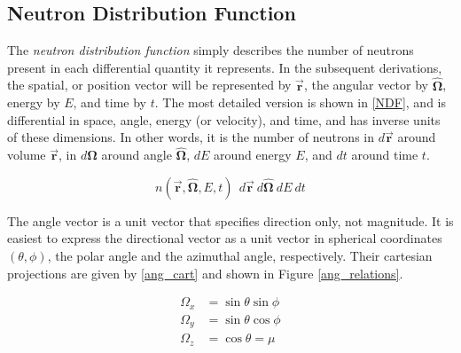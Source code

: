 \subsection{Neutron Distribution Function}

The \emph{neutron distribution function} simply describes the number of neutrons present in each differential quantity it represents.  In the subsequent derivations, the spatial, or position vector will be represented by $\boldsymbol{\vec{r}}$, the angular vector by $\boldsymbol{\hat{\Omega}}$, energy by $E$, and time by $t$.   The most detailed version is shown in \eqref{NDF}, and is differential in space, angle, energy (or velocity), and time, and has inverse units of these dimensions.  In other words, it is the number of neutrons in $d\boldsymbol{\vec{r}}$ around volume $\boldsymbol{\vec{r}}$, in $d \boldsymbol{\hat{\Omega}}$ around angle $\boldsymbol{\hat{\Omega}}$, $dE$ around energy $E$, and $dt$ around time $t$. 

\begin{equation}
\label{NDF}
n(\boldsymbol{\vec{r}},\boldsymbol{\hat{\Omega}},E,t) \:\: d\boldsymbol{\vec{r}} \: d \boldsymbol{\hat{\Omega}} \: dE \: dt
\end{equation}


The angle vector is a unit vector that specifies direction only, not magnitude.  It is easiest to express the directional vector as a unit vector in spherical coordinates $(\theta, \phi)$, the polar angle and the azimuthal angle, respectively.  Their cartesian projections are given by \eqref{ang_cart} and shown in Figure \ref{ang_relations}.

\begin{equation}
\label{ang_cart}
\begin{split}
\Omega_x &= \sin \theta \sin \phi  \\
\Omega_y &= \sin \theta \cos \phi \\
\Omega_z &= \cos \theta = \mu
\end{split}
\end{equation}

